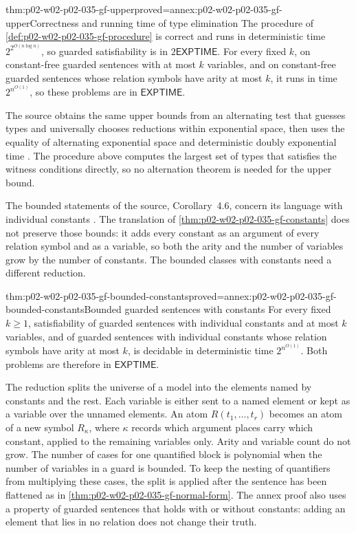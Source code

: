 \begin{hbtheorem}{thm:p02-w02-p02-035-gf-upper}{proved=annex:p02-w02-p02-035-gf-upper}{Correctness and running time of type elimination}
The procedure of \cref{def:p02-w02-p02-035-gf-procedure} is correct and runs
in deterministic time \(2^{2^{O(n\log n)}}\), so guarded satisfiability is in
\(2\mathsf{EXPTIME}\).  For every fixed \(k\), on constant-free guarded
sentences with at most \(k\) variables, and on constant-free guarded
sentences whose relation symbols have arity at most \(k\), it runs in time
\(2^{n^{O(1)}}\), so these problems are in \(\mathsf{EXPTIME}\).
\end{hbtheorem}

The source obtains the same upper bounds from an alternating test that
guesses types and universally chooses reductions within exponential space,
then uses the equality of alternating exponential space and deterministic
doubly exponential time \cite[thm.~4.3]{Gradel1999}.  The procedure above
computes the largest set of types that satisfies the witness conditions
directly, so no alternation theorem is needed for the upper bound.

The bounded statements of the source, Corollary~4.6, concern its language
with individual constants \cite[cor.~4.6]{Gradel1999}.  The translation of
\cref{thm:p02-w02-p02-035-gf-constants} does not preserve those bounds: it
adds every constant as an argument of every relation symbol and as a variable,
so both the arity and the number of variables grow by the number of constants.
The bounded classes with constants need a different reduction.

\begin{hbcorollary}{thm:p02-w02-p02-035-gf-bounded-constants}{proved=annex:p02-w02-p02-035-gf-bounded-constants}{Bounded guarded sentences with constants}
For every fixed \(k\geq1\), satisfiability of guarded sentences with
individual constants and at most \(k\) variables, and of guarded sentences
with individual constants whose relation symbols have arity at most \(k\), is
decidable in deterministic time \(2^{n^{O(1)}}\).  Both problems are therefore
in \(\mathsf{EXPTIME}\).
\end{hbcorollary}

The reduction splits the universe of a model into the elements named by
constants and the rest.  Each variable is either sent to a named element or
kept as a variable over the unnamed elements.  An atom \(R(t_1,\ldots,t_r)\)
becomes an atom of a new symbol \(R_\kappa\), where \(\kappa\) records which
argument places carry which constant, applied to the remaining variables
only.  Arity and variable count do not grow.  The number of cases for one
quantified block is polynomial when the number of variables in a guard is
bounded.  To keep the nesting of quantifiers from multiplying these cases,
the split is applied after the sentence has been flattened as in
\cref{thm:p02-w02-p02-035-gf-normal-form}.  The annex proof also uses a
property of guarded sentences that holds with or without constants: adding
an element that lies in no relation does not change their truth.

